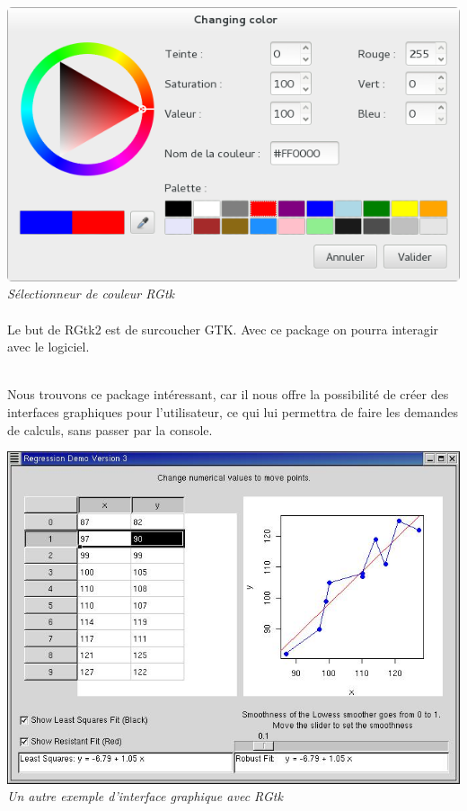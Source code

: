 \begin{center}
\includegraphics[scale=0.4]{colorselector2.png}\\
\textit{Sélectionneur de couleur RGtk}
\end{center}

\paragraph{}
Le but de RGtk2 est de surcoucher GTK. Avec ce package on pourra interagir avec le logiciel. \\\\\indent

Nous trouvons ce package intéressant, car il nous offre la possibilité de créer des interfaces graphiques pour l'utilisateur, ce qui lui permettra de faire les demandes de calculs, sans passer par la console. 

\begin{center}
\includegraphics[scale=0.4]{regression.jpg}\\
\textit{Un autre exemple d'interface graphique avec RGtk}
\end{center}